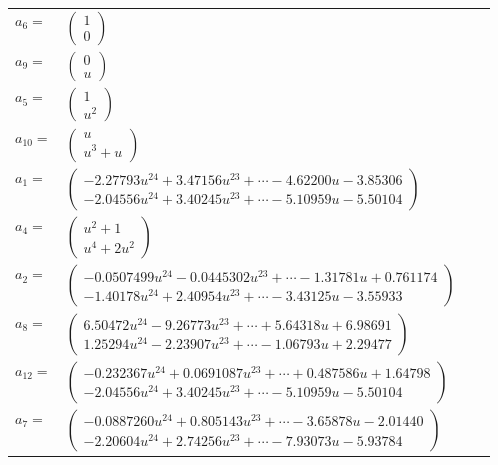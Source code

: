 \documentclass[1p]{elsarticle_modified}
\theoremstyle{definition}
\begin{document}
\begin{tabular}{m{7pt} m{180pt} m{7pt} m{180pt} }
\flushright $a_{6}=$&$\begin{pmatrix}1\\0\end{pmatrix}$ \\
\flushright $a_{9}=$&$\begin{pmatrix}0\\u\end{pmatrix}$ \\
\flushright $a_{5}=$&$\begin{pmatrix}1\\u^2\end{pmatrix}$ \\
\flushright $a_{10}=$&$\begin{pmatrix}u\\u^3+u\end{pmatrix}$ \\
\flushright $a_{1}=$&$\begin{pmatrix}-2.27793 u^{24}+3.47156 u^{23}+\cdots-4.62200 u-3.85306\\-2.04556 u^{24}+3.40245 u^{23}+\cdots-5.10959 u-5.50104\end{pmatrix}$ \\
\flushright $a_{4}=$&$\begin{pmatrix}u^2+1\\u^4+2 u^2\end{pmatrix}$ \\
\flushright $a_{2}=$&$\begin{pmatrix}-0.0507499 u^{24}-0.0445302 u^{23}+\cdots-1.31781 u+0.761174\\-1.40178 u^{24}+2.40954 u^{23}+\cdots-3.43125 u-3.55933\end{pmatrix}$ \\
\flushright $a_{8}=$&$\begin{pmatrix}6.50472 u^{24}-9.26773 u^{23}+\cdots+5.64318 u+6.98691\\1.25294 u^{24}-2.23907 u^{23}+\cdots-1.06793 u+2.29477\end{pmatrix}$ \\
\flushright $a_{12}=$&$\begin{pmatrix}-0.232367 u^{24}+0.0691087 u^{23}+\cdots+0.487586 u+1.64798\\-2.04556 u^{24}+3.40245 u^{23}+\cdots-5.10959 u-5.50104\end{pmatrix}$ \\
\flushright $a_{7}=$&$\begin{pmatrix}-0.0887260 u^{24}+0.805143 u^{23}+\cdots-3.65878 u-2.01440\\-2.20604 u^{24}+2.74256 u^{23}+\cdots-7.93073 u-5.93784\end{pmatrix}$ \\

\end{tabular}
\end{document}
